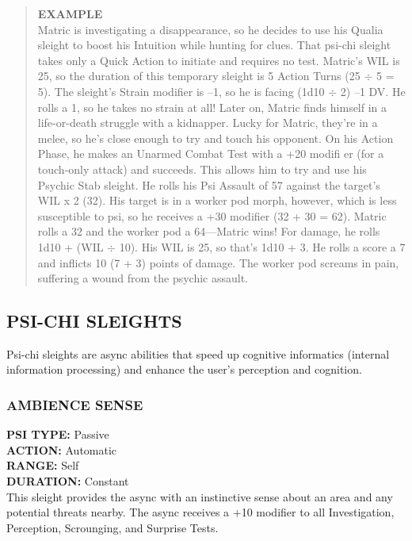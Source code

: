 \begin{quotation} \textbf{EXAMPLE} \\ Matric is investigating a disappearance, so he decides to use his Qualia sleight to boost his Intuition while hunting for clues. That psi-chi sleight takes only a Quick Action to initiate and requires no test. Matric’s WIL is 25, so the duration of this temporary sleight is 5 Action Turns (25 $\div$ 5 = 5). The sleight’s Strain modifier is –1, so he is facing (1d10 $\div$ 2) –1 DV. He rolls a 1, so he takes no strain at all! Later on, Matric finds himself in a life-or-death struggle with a kidnapper. Lucky for Matric, they’re in a melee, so he’s close enough to try and touch his opponent. On his Action Phase, he makes an Unarmed Combat Test with a +20 modifi er (for a touch-only attack) and succeeds. This allows him to try and use his Psychic Stab sleight. He rolls his Psi Assault of 57 against the target’s WIL x 2 (32). His target is in a worker pod morph, however, which is less susceptible to psi, so he receives a +30 modifier (32 + 30 = 62). Matric rolls a 32 and the worker pod a 64—Matric wins! For damage, he rolls 1d10 + (WIL $\div$ 10). His WIL is 25, so that’s 1d10 + 3. He rolls a score a 7 and inflicts 10 (7 + 3) points of damage. The worker pod screams in pain, suffering a wound from the psychic assault. 

\end{quotation} 





\subsection{PSI-CHI SLEIGHTS} Psi-chi sleights are async abilities that speed up cognitive informatics (internal information processing) and enhance the user’s perception and cognition. 

\subsubsection{AMBIENCE SENSE} \textbf{PSI TYPE:} Passive \\ \textbf{ACTION:} Automatic \\ \textbf{RANGE:} Self \\ \textbf{DURATION:} Constant \\ This sleight provides the async with an instinctive sense about an area and any potential threats nearby. The async receives a +10 modifier to all Investigation, Perception, Scrounging, and Surprise Tests. 

